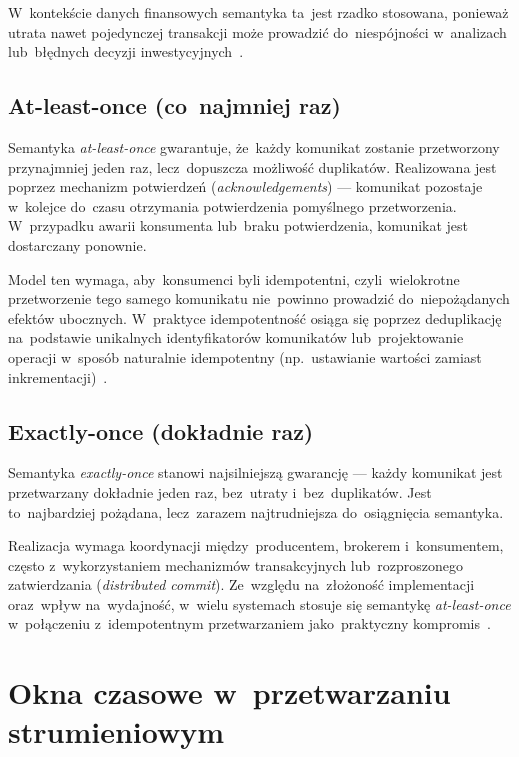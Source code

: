 W~kontekście danych finansowych semantyka ta~jest rzadko stosowana, ponieważ utrata nawet pojedynczej transakcji
może prowadzić do~niespójności w~analizach lub~błędnych decyzji inwestycyjnych~\cite{at_least_once}.

\subsection[At-least-once (co najmniej raz)]{At-least-once (co~najmniej raz)}
\label{subsec:at_least_once}

Semantyka \textit{at-least-once} gwarantuje, że~każdy komunikat zostanie przetworzony przynajmniej jeden raz,
lecz~dopuszcza możliwość duplikatów.
Realizowana jest poprzez mechanizm potwierdzeń (\textit{acknowledgements}) --- komunikat pozostaje w~kolejce do~czasu
otrzymania potwierdzenia pomyślnego przetworzenia.
W~przypadku awarii konsumenta lub~braku potwierdzenia, komunikat jest dostarczany ponownie.

Model ten wymaga, aby~konsumenci byli idempotentni, czyli~wielokrotne przetworzenie tego samego komunikatu
nie~powinno prowadzić do~niepożądanych efektów ubocznych.
W~praktyce idempotentność osiąga się poprzez deduplikację na~podstawie unikalnych identyfikatorów komunikatów
lub~projektowanie operacji w~sposób naturalnie idempotentny (np.~ustawianie wartości zamiast inkrementacji)~\cite{at_least_once}.

\subsection{Exactly-once (dokładnie raz)}
\label{subsec:exactly_once}

Semantyka \textit{exactly-once} stanowi najsilniejszą gwarancję --- każdy komunikat jest przetwarzany dokładnie
jeden raz, bez~utraty i~bez~duplikatów.
Jest to~najbardziej pożądana, lecz~zarazem najtrudniejsza do~osiągnięcia semantyka.

Realizacja wymaga koordynacji między~producentem, brokerem i~konsumentem, często z~wykorzystaniem mechanizmów
transakcyjnych lub~rozproszonego zatwierdzania (\textit{distributed commit}).
Ze~względu na~złożoność implementacji oraz~wpływ na~wydajność, w~wielu systemach stosuje się semantykę
\textit{at-least-once} w~połączeniu z~idempotentnym przetwarzaniem jako~praktyczny kompromis~\cite{at_least_once}.


\section[Okna czasowe w przetwarzaniu strumieniowym]{Okna czasowe w~przetwarzaniu strumieniowym}
\label{sec:okna_czasowe}

